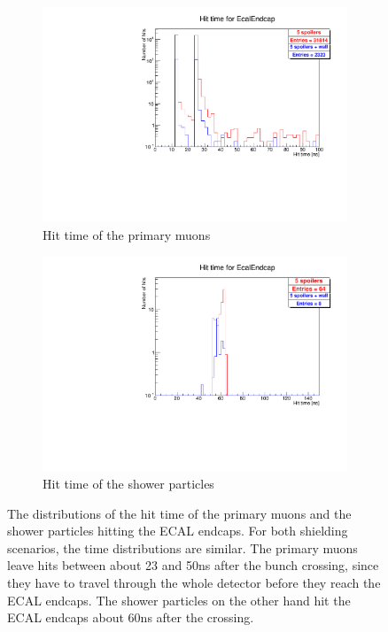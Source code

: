 \begin{figure}
    \centering
    \begin{subfigure}[b]{0.49\textwidth}
    \centering
        \includegraphics[height=0.26\textheight]{figures/muon_hittime_all_layers_EcalEndcap.pdf}
        \caption{Hit time of the primary muons}
	\label{fig:hittime_ECAL}
    \end{subfigure}
    \begin{subfigure}[b]{0.49\textwidth}
    \centering
        \includegraphics[height=0.26\textheight]{figures/muon_hittime_all_layers_shower_EcalEndcap.pdf}
        \caption{Hit time of the shower particles}
        \label{fig:hittime_shower_ECAL}
    \end{subfigure}
    \caption[Hit time distributions in the ECAL endcaps]{
    The distributions of the hit time of the primary muons and the shower particles hitting the ECAL endcaps.
    For both shielding scenarios, the time distributions are similar.
    The primary muons leave hits between about 23 and \unit{50}{ns} after the bunch crossing, since they have to travel through the whole detector before they reach the ECAL endcaps.
    The shower particles on the other hand hit the ECAL endcaps about \unit{60}{ns} after the crossing.
    }
    \label{fig:Hit_time}
\end{figure}